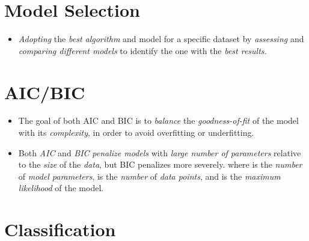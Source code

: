 \documentclass[
	number={1},
	title={Machine Learning Fundamentals}
]{cs584notes}
\begin{document}
\section{Model Selection}\label{sec:model-selection}
\begin{itemize}
	\item \emph{Adopting} the \emph{best algorithm} and model for a specific dataset by \emph{assessing} and \emph{comparing different models} to identify the one with the \emph{best results.}
\end{itemize}

\section{AIC/BIC}\label{sec:aic/bic}
\begin{itemize}
	\item The goal of both AIC and BIC is to \emph{balance} the \emph{goodness-of-fit} of the model with its \emph{complexity}, in order to avoid overfitting or underfitting.
	\item Both \emph{AIC} and \emph{BIC} \emph{penalize models} with \emph{large number of parameters} relative to the \emph{size} of the \emph{data}, but BIC penalizes more severely.
	where  is the \emph{number} of \emph{model parameters},  is the \emph{number} of \emph{data points}, and  is the \emph{maximum likelihood} of the model.
\end{itemize}

\section{Classification}\label{sec:classification}
\end{document}
